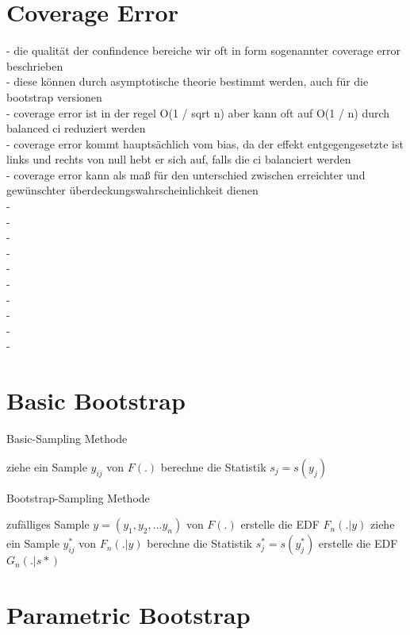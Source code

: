 \section{Coverage Error}
- die qualität der confindence bereiche wir oft in form sogenannter coverage error beschrieben\\
- diese können durch asymptotische theorie bestimmt werden, auch für die bootstrap versionen\\
- coverage error ist in der regel O(1 / sqrt n) aber kann oft auf O(1 / n) durch balanced ci reduziert werden \\
- coverage error kommt hauptsächlich vom bias, da der effekt entgegengesetzte ist links und rechts von null hebt er sich auf, falls die ci balanciert werden\\
- coverage error kann als maß für den unterschied zwischen erreichter und gewünschter überdeckungswahrscheinlichkeit dienen\\
- \\
- \\
- \\
- \\
- \\
- \\
- \\
- \\
- \\
- \\

\section{Basic Bootstrap}
\begin{algorithm} 
  \caption{Basic-Sampling Methode} 
  \label{algo:sampling} 

  \begin{algorithmic}
		    \STATE ziehe ein Sample $y_{ij}$ von $F(.)$
		  \ENDFOR
			\STATE berechne die Statistik $s_j = s(y_j)$
    \ENDFOR  
  \end{algorithmic}
\end{algorithm} 

\begin{algorithm} 
  \caption{Bootstrap-Sampling Methode} 
  \label{algo:bootstrap} 

  \begin{algorithmic}
    \REQUIRE zufälliges Sample $y = (y_1, y_2, ...y_n)$ von $F(.)$
    \STATE erstelle die EDF $F_n(.|y)$
			  \STATE ziehe ein Sample $y^*_{ij}$ von $F_n(.|y)$
			\ENDFOR
			\STATE berechne die Statistik $s^*_j = s(y^*_j)$
		\ENDFOR
		\STATE erstelle die EDF $G_n(.|s*)$ 
  \end{algorithmic}
\end{algorithm} 

\section{Parametric Bootstrap}




























